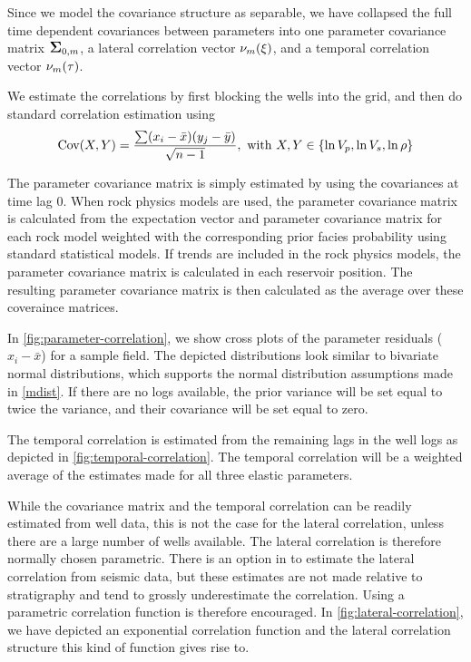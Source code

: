 Since we model the covariance structure as separable, we have
collapsed the full time dependent covariances between parameters into
one parameter covariance matrix $\mbox{\large\ensuremath{\boldsymbol{\Sigma}}}_{0,m}$, a lateral correlation
vector $\nu_m(\xi)$, and a temporal correlation vector
$\nu_m(\tau)$.

We estimate the correlations by first blocking the wells into the
grid, and then do standard correlation estimation using
\begin{equation}
\text{Cov}(X,Y) = \frac{\sum(x_i - \bar{x})(y_j - \bar{y})}{\sqrt{n - 1}},\
  \text{with}\ X,Y\in\{\ln V_p, \ln V_s, \ln\rho\}
\end{equation}

The parameter covariance matrix is simply estimated by using the
covariances at time lag 0. When rock physics models are used, the parameter covariance matrix is calculated from the expectation vector and parameter covariance matrix for each rock model weighted with the corresponding prior facies probability using standard statistical models. If trends are included in the rock physics models, the parameter covariance matrix is calculated in each reservoir position. The resulting parameter covariance matrix is then calculated as the average over these coveraince matrices. 

In \autoref{fig:parameter-correlation}, we
show cross plots of the parameter residuals ($x_i - \bar{x}$) for a
sample field. The depicted distributions look similar to bivariate
normal distributions, which supports the normal distribution
assumptions made in \autoref{mdist}. If there are no \vs logs
available, the prior \vs variance will be set equal to twice the \vp
variance, and their covariance will be set equal to zero.

The temporal correlation is estimated from the remaining lags in the
well logs as depicted in \autoref{fig:temporal-correlation}. The
temporal correlation will be a weighted average of the estimates made
for all three elastic parameters.

While the covariance matrix and the temporal correlation can be readily
estimated from well data, this is not the case for the lateral
correlation, unless there are a large number of wells available. The
lateral correlation is therefore normally chosen parametric. There is
an option in \crava to estimate the lateral correlation from seismic
data, but these estimates are not made relative to stratigraphy and
tend to grossly underestimate the correlation. Using a parametric
correlation function is therefore encouraged. In
\autoref{fig:lateral-correlation}, we have depicted an exponential
correlation function and the lateral correlation structure this kind
of function gives rise to.

